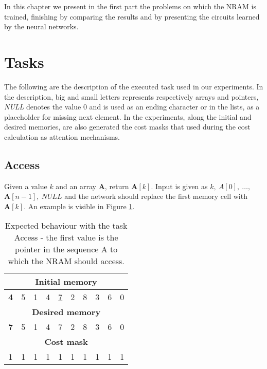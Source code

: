 \label{experiments}
In this chapter we present in the first part the problems on which the NRAM is trained, finishing by comparing the results and by presenting the circuits learned by the neural networks.

\section{Tasks}
The following are the description of the executed task used in our experiments. In the description, big and small letters represents respectively arrays and pointers, \textit{NULL} denotes the value 0 and is used as an ending character or in the lists, as a placeholder for missing next element. In the experiments, along the initial and desired memories, are also generated the cost masks that used during the cost calculation as attention mechanisms.

\subsection{Access}
Given a value $k$ and an array \textbf{A}, return $\textbf{A}[k]$. Input is given as $k,\ A[0],\ \dots,\ $\\$\textbf{A}[n-1],\ \textit{NULL}$ and the network should replace the first memory cell with $\textbf{A}[k]$. An example is visible in Figure \ref{fig:access-example}.
\begin{table}[h!]
	\centering
	\begin{tabular}{|c|c|c|c|c|c|c|c|c|c|}
		\hline
		\multicolumn{10}{|c|}{\textbf{Initial memory}} \\ \hline
		\textbf{4} & 5 & 1 & 4 & \underline{7} & 2 & 8 & 3 & 6 & 0 \\ \hline\hline\hline
		\multicolumn{10}{|c|}{\textbf{Desired memory}} \\ \hline
		\textbf{7} & 5 & 1 & 4 & 7 & 2 & 8 & 3 & 6 & 0 \\ \hline\hline\hline
		\multicolumn{10}{|c|}{\textbf{Cost mask}} \\ \hline
		1 & 1 & 1 & 1 & 1 & 1 & 1 & 1 & 1 & 1 \\ \hline
	\end{tabular}
	\caption{Expected behaviour with the task Access - the first value is the pointer in the sequence A to which the NRAM should access.}
	\label{fig:access-example}
\end{table}
\FloatBarrier
